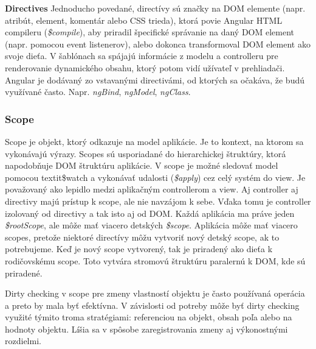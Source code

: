 \textbf{Directives}\label{angular-directives}
Jednoducho povedané, directívy sú značky na DOM elemente (napr. atribút, element, komentár alebo CSS trieda), ktorá povie Angular HTML compileru (\textit{\$compile}), aby priradil špecifické správanie na daný DOM element (napr. pomocou event listenerov), alebo dokonca transformoval DOM element ako svoje dieťa. V šablónach sa spájajú informácie z modelu a controlleru pre renderovanie dynamického obsahu, ktorý potom vidí užívateľ v prehliadači.
Angular je dodávaný zo vstavanými directivámi, od ktorých sa očakáva, že budú využívané často. Napr. \textit{ngBind}, \textit{ngModel}, \textit{ngClass}.

\subsubsection{Scope}
Scope je objekt, ktorý odkazuje na model aplikácie. Je to kontext, na ktorom sa vykonávajú výrazy. Scopes sú usporiadané do hierarchickej štruktúry, ktorá napodobňuje DOM štruktúru aplikácie. V scope je možné sledovať model pomocou  textit{\$watch} a vykonávať udalosti (\textit{\$apply}) cez celý systém do view. Je považovaný ako lepidlo medzi aplikačným controllerom a view. Aj controller aj directivy majú prístup k scope, ale nie navzájom k sebe. Vďaka tomu je controller izolovaný od directivy a tak isto aj od DOM. 
Každá aplikácia ma práve jeden \textit{\$rootScope}, ale môže mať viacero detských \textit{\$scope}. Aplikácia môže mať viacero scopes, pretože niektoré directívy môžu vytvoriť nový detský scope, ak to potrebujeme. Keď je nový scope vytvorený, tak je priradený ako dieťa k rodičovskému scope. Toto vytvára stromovú štruktúru paralernú k DOM, kde sú priradené.

Dirty checking v scope pre zmeny vlastností objektu je často používaná operácia a preto by mala byť efektívna. V závislosti od potreby môže byť dirty checking využité týmito troma stratégiami: referenciou na objekt, obsah poľa alebo na hodnoty objektu. Líšia sa v spôsobe zaregistrovania zmeny aj výkonostnými rozdielmi.


